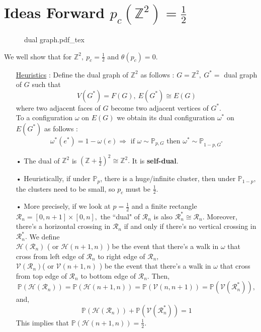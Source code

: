 \documentclass[12pt,a4paper]{report}
\theoremstyle{definition}
\newcommand{\incfig}[1]{%
{#1.pdf_tex}
}
\begin{document}
\section{Ideas Forward $p_c(\mathbb{Z}^2)=\frac{1}{2}$}
\begin{figure}[htp]
\centering
\def\svgwidth{14cm}
\incfig{dual graph}
\end{figure}
We well show that for $\mathbb{Z}^2,\ p_c=\frac{1}{2}$ and $\theta(p_c)=0.$
\begin{enumerate}
    \item[\underline{Heuristics}] : Define the dual graph of $\mathbb{Z}^2$ as follows : $G=\mathbb{Z}^2,\ G^*=$ dual graph of $G$ such that
    \[
    V(G^*)=F(G),\ E(G^*)\cong E(G)
    \]
    where two adjacent faces of $G$ become two adjacent vertices of $G^*.$\\
    To a configuration $\omega$ on $E(G)$ we obtain its dual configuration $\omega^*$ on $E(G^*)$ as follows :
    \[
    \omega^*(e^*)=1-\omega(e)\Rightarrow \mbox{ if }\omega\sim\mathbb{P}_{p,G}\mbox{ then }\omega^*\sim\mathbb{P}_{1-p,G^*}
    \]
    \item[•] The dual of $\mathbb{Z}^2$ is $(\mathbb{Z}+\frac{1}{2})^2\cong\mathbb{Z}^2.$ It is \textbf{self-dual}.
    \item[•] Heuristically, if under $\mathbb{P}_p$, there is a huge/infinite cluster, then under $\mathbb{P}_{1-p},$ the clusters need to be small, so $p_c$ must be $\frac{1}{2}.$
    \item[•] More precisely, if we look at $p=\frac{1}{2}$ and a finite rectangle $\mathcal{R}_n=[0,n+1]\times[0,n],$ the ``dual" of $\mathcal{R}_n$ is also $\mathcal{R}_n^*\cong\mathcal{R}_n.$ Moreover, there's a horizontal crossing in $\mathcal{R}_n$ if and only if there's no vertical crossing in $\mathcal{R}_n^*.$ We define\\[5pt]
    $\mathcal{H}(\mathcal{R}_n)$ ( or $\mathcal{H}(n+1,n)$ ) be the event that there's a walk in $\omega$ that cross from left edge of $\mathcal{R}_n$ to right edge of $\mathcal{R}_n,$\\[5pt]
    $\mathcal{V}(\mathcal{R}_n)$( or $\mathcal{V}(n+1,n)$ ) be the event that there's a walk in $\omega$ that cross from top edge of $\mathcal{R}_n$ to bottom edge of $\mathcal{R}_n.$ Then, 
    \[
    \mathbb{P}(\mathcal{H}(\mathcal{R}_n))=\mathbb{P}(\mathcal{H}(n+1,n))=\mathbb{P}(\mathcal{V}(n,n+1))=\mathbb{P}(\mathcal{V}(\mathcal{R}^*_n)),
    \]
    and,
    \[
    \mathbb{P}(\mathcal{H}(\mathcal{R}_n))+\mathbb{P}(\mathcal{V}(\mathcal{R}^*_n))=1
    \]
    This implies that $\mathbb{P}(\mathcal{H}(n+1,n))=\frac{1}{2}.$
\end{enumerate}
\end{document}
